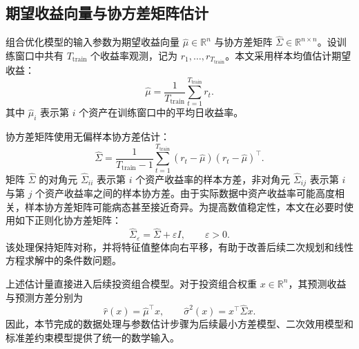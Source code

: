 \documentclass[UTF8,12pt]{ctexart}
\begin{document}
\subsection{期望收益向量与协方差矩阵估计}

组合优化模型的输入参数为期望收益向量 $\hat\mu\in\mathbb{R}^n$ 与协方差矩阵 $\hat\Sigma\in\mathbb{R}^{n\times n}$。设训练窗口中共有 $T_{\mathrm{train}}$ 个收益率观测，记为 $r_1,\ldots,r_{T_{\mathrm{train}}}$。本文采用样本均值估计期望收益：
\[
\hat\mu=\frac{1}{T_{\mathrm{train}}}\sum_{t=1}^{T_{\mathrm{train}}}r_t.
\]
其中 $\hat\mu_i$ 表示第 $i$ 个资产在训练窗口中的平均日收益率。

协方差矩阵使用无偏样本协方差估计：
\[
\hat\Sigma=\frac{1}{T_{\mathrm{train}}-1}
\sum_{t=1}^{T_{\mathrm{train}}}(r_t-\hat\mu)(r_t-\hat\mu)^\top.
\]
矩阵 $\hat\Sigma$ 的对角元 $\hat\Sigma_{ii}$ 表示第 $i$ 个资产收益率的样本方差，非对角元 $\hat\Sigma_{ij}$ 表示第 $i$ 与第 $j$ 个资产收益率之间的样本协方差。由于实际数据中资产收益率可能高度相关，样本协方差矩阵可能病态甚至接近奇异。为提高数值稳定性，本文在必要时使用如下正则化协方差矩阵：
\[
\hat\Sigma_\varepsilon=\hat\Sigma+\varepsilon I,
\qquad \varepsilon>0.
\]
该处理保持矩阵对称，并将特征值整体向右平移，有助于改善后续二次规划和线性方程求解中的条件数问题。

上述估计量直接进入后续投资组合模型。对于投资组合权重 $x\in\mathbb{R}^n$，其预测收益与预测方差分别为
\[
\hat r(x)=\hat\mu^\top x,
\qquad
\hat\sigma^2(x)=x^\top\hat\Sigma x.
\]
因此，本节完成的数据处理与参数估计步骤为后续最小方差模型、二次效用模型和标准差约束模型提供了统一的数学输入。
\end{document}
